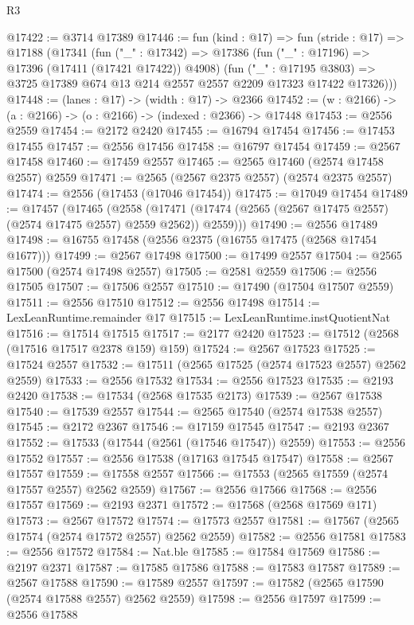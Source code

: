 \begin{lexlean}{R3}
\begin{coremodule}
@17422 := @3714 @17389
@17446 := fun (kind : @17) =>
  fun (stride : @17) =>
  @17188
    (@17341
      (fun ("_" : @17342) =>
      @17386
        (fun ("_" : @17196) => @17396 (@17411 (@17421 @17422)) @4908)
        (fun ("_" : @17195 @3803) =>
        @3725 @17389 @674 @13 @214 @2557 @2557 @2209 @17323 @17422 @17326)))
@17448 := (lanes : @17) -> (width : @17) -> @2366
@17452 := (w : @2166) -> (a : @2166) -> (o : @2166) -> (indexed : @2366) -> @17448
@17453 := @2556 @2559
@17454 := @2172 @2420
@17455 := @16794 @17454
@17456 := @17453 @17455
@17457 := @2556 @17456
@17458 := @16797 @17454
@17459 := @2567 @17458
@17460 := @17459 @2557
@17465 := @2565 @17460 (@2574 @17458 @2557) @2559
@17471 := @2565 (@2567 @2375 @2557) (@2574 @2375 @2557)
@17474 := @2556 (@17453 (@17046 @17454))
@17475 := @17049 @17454
@17489 := @17457
    (@17465
      (@2558 (@17471 (@17474 (@2565 (@2567 @17475 @2557) (@2574 @17475 @2557) @2559 @2562)) @2559)))
@17490 := @2556 @17489
@17498 := @16755 @17458 (@2556 @2375 (@16755 @17475 (@2568 @17454 @1677)))
@17499 := @2567 @17498
@17500 := @17499 @2557
@17504 := @2565 @17500 (@2574 @17498 @2557)
@17505 := @2581 @2559
@17506 := @2556 @17505
@17507 := @17506 @2557
@17510 := @17490 (@17504 @17507 @2559)
@17511 := @2556 @17510
@17512 := @2556 @17498
@17514 := LexLeanRuntime.remainder @17
@17515 := LexLeanRuntime.instQuotientNat
@17516 := @17514 @17515
@17517 := @2177 @2420
@17523 := @17512 (@2568 (@17516 @17517 @2378 @159) @159)
@17524 := @2567 @17523
@17525 := @17524 @2557
@17532 := @17511 (@2565 @17525 (@2574 @17523 @2557) @2562 @2559)
@17533 := @2556 @17532
@17534 := @2556 @17523
@17535 := @2193 @2420
@17538 := @17534 (@2568 @17535 @2173)
@17539 := @2567 @17538
@17540 := @17539 @2557
@17544 := @2565 @17540 (@2574 @17538 @2557)
@17545 := @2172 @2367
@17546 := @17159 @17545
@17547 := @2193 @2367
@17552 := @17533 (@17544 (@2561 (@17546 @17547)) @2559)
@17553 := @2556 @17552
@17557 := @2556 @17538 (@17163 @17545 @17547)
@17558 := @2567 @17557
@17559 := @17558 @2557
@17566 := @17553 (@2565 @17559 (@2574 @17557 @2557) @2562 @2559)
@17567 := @2556 @17566
@17568 := @2556 @17557
@17569 := @2193 @2371
@17572 := @17568 (@2568 @17569 @171)
@17573 := @2567 @17572
@17574 := @17573 @2557
@17581 := @17567 (@2565 @17574 (@2574 @17572 @2557) @2562 @2559)
@17582 := @2556 @17581
@17583 := @2556 @17572
@17584 := Nat.ble
@17585 := @17584 @17569
@17586 := @2197 @2371
@17587 := @17585 @17586
@17588 := @17583 @17587
@17589 := @2567 @17588
@17590 := @17589 @2557
@17597 := @17582 (@2565 @17590 (@2574 @17588 @2557) @2562 @2559)
@17598 := @2556 @17597
@17599 := @2556 @17588

\end{coremodule}
\end{lexlean}
